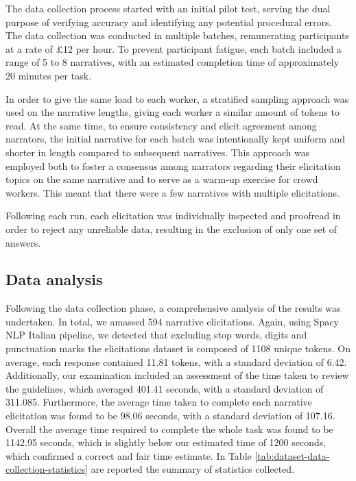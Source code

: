 The data collection process started with an initial pilot test, serving the dual purpose of verifying accuracy and identifying any potential procedural errors. The data collection was conducted in multiple batches, remunerating participants at a rate of £12 per hour. To prevent participant fatigue, each batch included a range of 5 to 8 narratives, with an estimated completion time of approximately 20 minutes per task.

In order to give the same load to each worker, a stratified sampling approach was used on the narrative lengths, giving each worker a similar amount of tokens to read. At the same time, to ensure consistency and elicit agreement among narrators, the initial narrative for each batch was intentionally kept uniform and shorter in length compared to subsequent narratives. This approach was employed both to foster a consensus among narrators regarding their elicitation topics on the same narrative and to serve as a warm-up exercise for crowd workers. This meant that there were a few narratives with multiple elicitations.

Following each run, each elicitation was individually inspected and proofread in order to reject any unreliable data, resulting in the exclusion of only one set of answers.


\subsection{Data analysis}


Following the data collection phase, a comprehensive analysis of the results was undertaken. In total, we amassed 594 narrative elicitations. Again, using Spacy NLP Italian pipeline, we detected that excluding stop words, digits and punctuation marks the elicitations dataset is composed of 1108 unique tokens. On average, each response contained 11.81 tokens, with a standard deviation of 6.42. Additionally, our examination included an assessment of the time taken to review the guidelines, which averaged 401.41 seconds, with a standard deviation of 311.085. Furthermore, the average time taken to complete each narrative elicitation was found to be 98.06 seconds, with a standard deviation of 107.16. Overall the average time required to complete the whole task was found to be 1142.95 seconds, which is slightly below our estimated time of 1200 seconds, which confirmed a correct and fair time estimate. In Table \ref{tab:dataset-data-collection-statistics} are reported the summary of statistics collected. 

